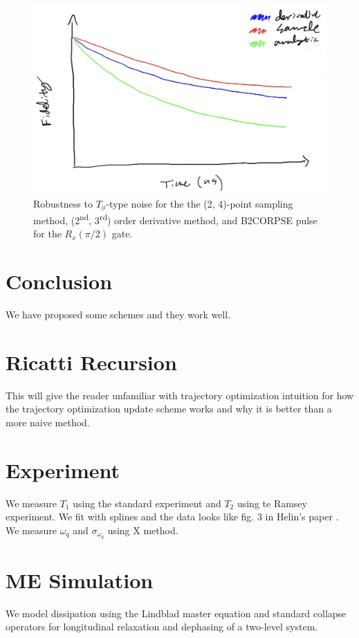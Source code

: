 \documentclass[
  amsfonts,
  amsmath,
  tbtags,
  amssymb,
  aps,
  nobibnotes,
  twocolumn,
]{revtex4-2}
\begin{document}
\begin{figure}
  \includegraphics[width=\linewidth]{assets/t2_temp.jpg}
  \caption{Robustness to $T_{\phi}$-type noise for the
    the (2, 4)-point sampling method, (2\textsuperscript{nd}, 3\textsuperscript{rd})
    order derivative method, and B2CORPSE pulse for the $R_{x}(\pi/2)$ gate.}
\end{figure}

\section{Conclusion}
We have proposed some schemes and they work well.


\appendix
\section{Ricatti Recursion}
This will give the reader unfamiliar with trajectory
optimization intuition for how the trajectory optimization
update scheme works and why it is better than
a more naive method.


\section{Experiment}
We measure $T_{1}$ using the standard experiment
and $T_{2}$ using te Ramsey experiment. We fit with splines
and the data looks like fig. 3 in Helin's paper \cite{zhang2020universal}.
We measure $\omega_{q}$ and $\sigma_{\omega_{q}}$ using X method.


\section{ME Simulation}
We model dissipation using the Lindblad master
equation and standard collapse operators for
longitudinal relaxation and dephasing
of a two-level system.
\end{document}
